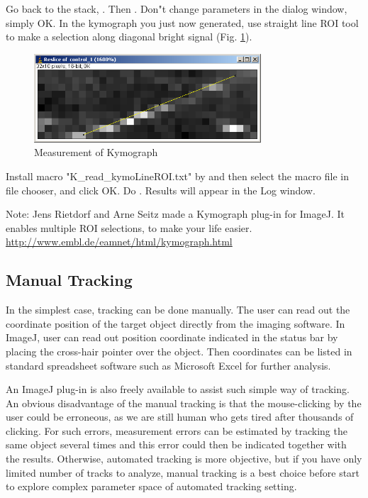 \begin{indentexercise}{1}
Go back to the stack, . Then . Don"t change parameters in the dialog window, simply OK. In the kymograph you just now generated, use straight line ROI tool to make a selection along diagonal bright signal (Fig. \ref{fig:img134}). 

\begin{figure}[htbp]
\begin{center}
\includegraphics[width=8.467cm,height=3.307cm]{img/CMCIBasicCourse201102-img134.png}
\caption{ Measurement of Kymograph}
\label{fig:img134}
\end{center}
\end{figure}

Install macro "K\_read\_kymoLineROI.txt" by  and then select the macro file in file chooser, and click OK. Do . Results will appear in the Log window. 

Note: Jens Rietdorf and Arne Seitz made a Kymograph plug-in for ImageJ. It enables multiple ROI selections, to make your life easier. \\
\url{http://www.embl.de/eamnet/html/kymograph.html}

\end{indentexercise}

\subsection{Manual Tracking}
\label{subsubsec:manualtracker}

In the simplest case, tracking can be done manually. The user can read
out the coordinate position of the target object directly from the
imaging software. In ImageJ, user can read out position coordinate
indicated in the status bar by placing the cross-hair pointer over the
object. Then coordinates can be listed in standard spreadsheet software
such as Microsoft Excel for further analysis. 

An ImageJ plug-in is also freely available to assist such simple way of
tracking. An obvious disadvantage of the manual tracking is that the
mouse-clicking by the user could be erroneous, as we are still human
who gets tired after thousands of clicking. For such errors,
measurement errors can be estimated by tracking the same object several
times and this error could then be indicated together with the results.
Otherwise, automated tracking is more objective, but if you have only
limited number of tracks to analyze, manual tracking is a best choice
before start to explore complex parameter space of automated tracking
setting.

